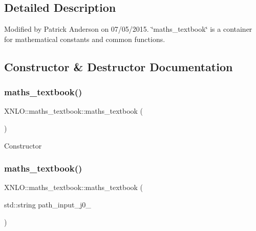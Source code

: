 \subsection{Detailed Description}
Modified by Patrick Anderson on 07/05/2015. \char`\"{}maths\+\_\+textbook\char`\"{} is a container for mathematical constants and common functions. 

\subsection{Constructor \& Destructor Documentation}
\mbox{\label{class_x_n_l_o_1_1maths__textbook_a5d6ac644a6473eb0ef1eabf77b7f3c13}} 
\subsubsection{\texorpdfstring{maths\+\_\+textbook()}{maths\_textbook()}\hspace{0.1cm}{\footnotesize\ttfamily [1/2]}}
{\footnotesize\ttfamily X\+N\+L\+O\+::maths\+\_\+textbook\+::maths\+\_\+textbook (\begin{DoxyParamCaption}{ }\end{DoxyParamCaption})}

Constructor \mbox{\label{class_x_n_l_o_1_1maths__textbook_a650dad745c7da4fc6d285924c2a3e1a0}} 
\subsubsection{\texorpdfstring{maths\+\_\+textbook()}{maths\_textbook()}\hspace{0.1cm}{\footnotesize\ttfamily [2/2]}}
{\footnotesize\ttfamily X\+N\+L\+O\+::maths\+\_\+textbook\+::maths\+\_\+textbook (\begin{DoxyParamCaption}\item[{std\+::string}]{path\+\_\+input\+\_\+j0\+\_\+ }\end{DoxyParamCaption})}

